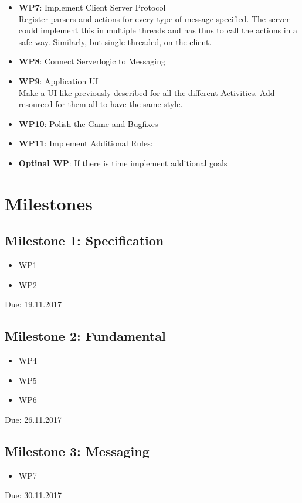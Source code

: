 \documentclass{report}
\begin{document}
\begin{itemize}
		\item {\bf WP7}: Implement Client Server Protocol\\
		Register parsers and actions for every type of message specified. The server could implement this in multiple threads and has thus to call the actions in a safe way. Similarly, but single-threaded, on the client.	
		
		\item {\bf WP8}: Connect Serverlogic to Messaging	
		
		\item {\bf WP9}: Application UI\\
		Make a UI like previously described for all the different Activities. Add resourced for them all to have the same style.
		
		\item {\bf WP10}: Polish the Game and Bugfixes
		
		\item {\bf WP11}: Implement Additional Rules:
		
		\item {\bf Optinal WP}: If there is time implement additional goals 
        
        
\end{itemize}

\section{Milestones}

\subsection{Milestone 1: Specification}
\begin{itemize}
	\item WP1
	\item WP2
\end{itemize}
Due: 19.11.2017

\subsection{Milestone 2: Fundamental}
\begin{itemize}
	\item WP4
	\item WP5
	\item WP6
\end{itemize}
Due: 26.11.2017
	
\subsection{Milestone 3: Messaging}
\begin{itemize}
	\item WP7
\end{itemize}
Due: 30.11.2017
\end{document}
